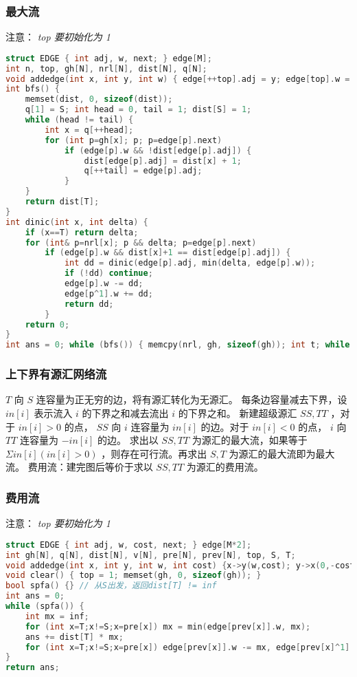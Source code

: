 \documentclass[landscape,a4paper]{article}
\begin{document}
\subsubsection{最大流}
注意： \emph{top 要初始化为 1}
\begin{lstlisting}[language=C++]
struct EDGE { int adj, w, next; } edge[M];
int n, top, gh[N], nrl[N], dist[N], q[N];
void addedge(int x, int y, int w) { edge[++top].adj = y; edge[top].w = w; edge[top].next = gh[x]; gh[x] = top; edge[++top].adj = x; edge[top].w = 0; edge[top].next = gh[y]; gh[y] = top; }
int bfs() {
	memset(dist, 0, sizeof(dist));
	q[1] = S; int head = 0, tail = 1; dist[S] = 1;
	while (head != tail) {
		int x = q[++head];
		for (int p=gh[x]; p; p=edge[p].next)
			if (edge[p].w && !dist[edge[p].adj]) {
				dist[edge[p].adj] = dist[x] + 1;
				q[++tail] = edge[p].adj;
			}
	}
	return dist[T];
}
int dinic(int x, int delta) {
	if (x==T) return delta;
	for (int& p=nrl[x]; p && delta; p=edge[p].next)
		if (edge[p].w && dist[x]+1 == dist[edge[p].adj]) {
			int dd = dinic(edge[p].adj, min(delta, edge[p].w));
			if (!dd) continue;
			edge[p].w -= dd;
			edge[p^1].w += dd;
			return dd;
		}
	return 0;
}
int ans = 0; while (bfs()) { memcpy(nrl, gh, sizeof(gh)); int t; while (t = dinic(S, inf)) ans += t; } return ans;
\end{lstlisting}
\subsubsection{上下界有源汇网络流}

$T$ 向 $S$ 连容量为正无穷的边，将有源汇转化为无源汇。
每条边容量减去下界，设 $in[i]$ 表示流入 $i$ 的下界之和减去流出 $i$ 的下界之和。  
新建超级源汇 $SS, TT$ ，对于 $in[i] > 0$ 的点， $SS$ 向 $i$ 连容量为 $in[i]$ 的边。对于 $in[i] < 0$ 的点， $i$ 向 $TT$ 连容量为 $-in[i]$ 的边。 
求出以 $SS, TT$ 为源汇的最大流，如果等于 $\Sigma in[i] (in[i]>0)$ ，则存在可行流。再求出 $S, T$ 为源汇的最大流即为最大流。 
费用流：建完图后等价于求以 $SS, TT$ 为源汇的费用流。

\subsubsection{费用流}
注意： \emph{top 要初始化为 1}
\begin{lstlisting}[language=C++]
struct EDGE { int adj, w, cost, next; } edge[M*2];
int gh[N], q[N], dist[N], v[N], pre[N], prev[N], top, S, T;
void addedge(int x, int y, int w, int cost) {x->y(w,cost); y->x(0,-cost);}
void clear() { top = 1; memset(gh, 0, sizeof(gh)); }
bool spfa() {} // 从S出发，返回dist[T] != inf
int ans = 0;
while (spfa()) {
	int mx = inf;
	for (int x=T;x!=S;x=pre[x]) mx = min(edge[prev[x]].w, mx);
	ans += dist[T] * mx; 
	for (int x=T;x!=S;x=pre[x]) edge[prev[x]].w -= mx, edge[prev[x]^1].w += mx;
}
return ans;
\end{lstlisting}
\end{document}
